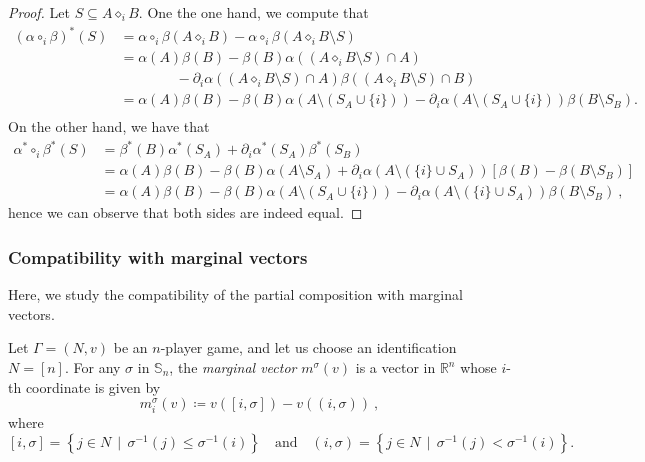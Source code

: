 \documentclass[a4paper,12pt]{amsart}
\begin{document}
\begin{proof}
Let $S \subseteq A \diamond_i B$. One the one hand, we compute that
\[
\begin{aligned} 
   (\alpha \circ_i \beta)^*(S) & = \alpha \circ_i \beta(A \diamond_i B) - \alpha \circ_i \beta(A \diamond_i B \setminus S) \\
   & = \alpha(A)\beta(B) - \beta(B)\alpha((A \diamond_i B \setminus S) \cap A) \\ & \qquad \qquad - \partial_i \alpha((A \diamond_i B \setminus S) \cap A)\beta((A \diamond_i B \setminus S) \cap B) \\
   & = \alpha(A)\beta(B) - \beta(B)\alpha(A \setminus (S_A \cup \{i\})) - \partial_i \alpha(A \setminus (S_A \cup \{i\}))\beta(B \setminus S_B). \\ 
\end{aligned} 
\]
On the other hand, we have that
\[
\begin{aligned} 
   \alpha^* \circ_i \beta^*(S) & = \beta^*(B)\alpha^*(S_A) + \partial_i\alpha^*(S_A)\beta^*(S_B) \\
   &= \alpha(A)\beta(B) - \beta(B)\alpha(A \setminus S_A) + \partial_i\alpha(A \setminus (\{i\} \cup S_A))[\beta(B) - \beta(B \setminus S_B)] \\
   &= \alpha(A)\beta(B) - \beta(B)\alpha(A \setminus (S_A \cup \{i\})) - \partial_i\alpha(A \setminus (\{i\} \cup S_A))\beta(B \setminus S_B)~,
\end{aligned} 
\]
hence we can observe that both sides are indeed equal. 
\end{proof}

\subsubsection{Compatibility with marginal vectors}
Here, we study the compatibility of the partial composition with marginal vectors. 

\begin{definition}
Let $\Gamma = (N,v)$ be an $n$-player game, and let us choose an identification $N = [n]$. For any $\sigma$ in $\mathbb{S}_n$, the \textit{marginal vector} $m^\sigma(v)$ is a vector in $\mathbb{R}^n$ whose $i$-th coordinate is given by 
\[
m^\sigma_i(v) \coloneqq v([i, \sigma]) - v((i, \sigma))~,
\]
where
\[
[i,\sigma] = \left\{j \in N ~~|~~ \sigma^{-1}(j) \leq \sigma^{-1}(i) \right\} \quad \text{and} \quad (i, \sigma) = \left\{j \in N ~~|~~ \sigma^{-1}(j) < \sigma^{-1}(i) \right\}. 
\]
\end{definition}
\end{document}
